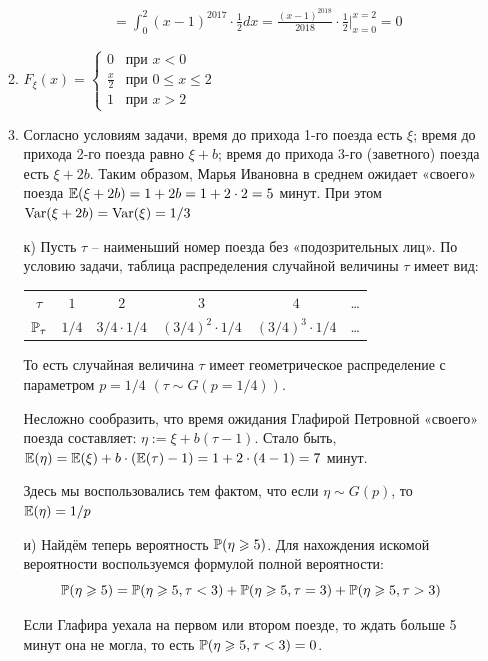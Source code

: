 \begin{enumerate}
\begin{enumerate}
\begin{align*}
&= \int_{0}^{2} (x-1)^{2017} \cdot \frac{1}{2} dx = \frac{(x-1)^{2018}}{2018} \cdot \frac{1}{2} \bigg\rvert_{x=0}^{x=2} =0
\end{align*}
\item $F_{\xi} (x) =
\begin{cases}
0 & \text{при } x < 0 \\
\frac{x}{2} & \text{при } 0 \leq x \leq 2 \\
1 & \text{при } x > 2
\end{cases}
$
\item Согласно условиям задачи, время до прихода 1-го поезда есть $\xi$; время до прихода 2-го поезда равно $\xi + b$; время до прихода 3-го (заветного) поезда есть $\xi + 2b$. Таким образом, Марья Ивановна в среднем ожидает «своего» поезда $\E (\xi + 2b) = 1 + 2b = 1 + 2 \cdot 2 = 5 $ минут. При этом $\Var (\xi + 2b) = \Var (\xi) = 1/3$
\item[к)] Пусть $\tau$ – наименьший номер поезда без «подозрительных лиц». По условию задачи, таблица распределения случайной величины $\tau$ имеет вид:

\begin{center}
\begin{tabular}{cccccc}
\toprule
$\tau$ & $ 1 $ & $2$ & $3$ & $4$ & \ldots \\
$\P_{\tau}$ & $1/4$ & $3/4\cdot1/4$ & $(3/4)^2 \cdot 1/4$ & $(3/4)^3 \cdot 1/4$ & \ldots\\ \bottomrule
\end{tabular}
\end{center}

То есть случайная величина $\tau$ имеет геометрическое распределение с параметром $p=1/4$ $(\tau \sim G(p=1/4))$.

Несложно сообразить, что время ожидания Глафирой Петровной «своего» поезда составляет: $\eta := \xi + b(\tau- 1)$. Стало быть, $\E (\eta) = \E (\xi) + b \cdot (\E(\tau)-1)  = 1 + 2 \cdot (4-1) = 7$ минут.

Здесь мы воспользовались тем фактом, что если $\eta \sim G(p)$, то $\E (\eta) = 1/p$
\item[и)] Найдём теперь вероятность $\P (\eta \geq 5 )$. Для нахождения искомой вероятности воспользуемся формулой полной вероятности:
\[
	\P (\eta \geq 5 ) = \P(\eta \geq 5, \tau < 3) +\P(\eta \geq 5, \tau = 3)+\P(\eta \geq 5, \tau > 3)
\]

Если Глафира уехала на первом или втором поезде,
то ждать больше 5 минут она не могла, то есть $\P(\eta \geq 5, \tau <3)=0$.


\end{enumerate}
\end{enumerate}
